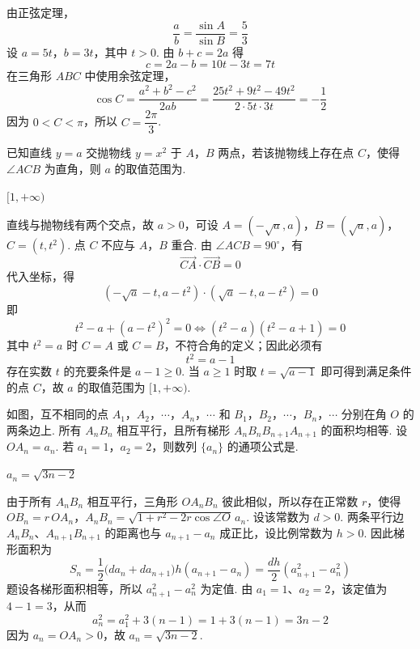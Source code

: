 \begin{solution}
由正弦定理，
\[
\frac{a}{b}=\frac{\sin A}{\sin B}=\frac53
\]
设 \(a=5t\)，\(b=3t\)，其中 \(t>0\). 由 \(b+c=2a\) 得
\[
c=2a-b=10t-3t=7t
\]
在三角形 \(ABC\) 中使用余弦定理，
\[
\cos C=\frac{a^2+b^2-c^2}{2ab}
=\frac{25t^2+9t^2-49t^2}{2\cdot5t\cdot3t}
=-\frac12
\]
因为 \(0<C<\pi\)，所以 \(C=\dfrac{2\pi}{3}\).
\end{solution}

\begin{problem}
已知直线 \( y = a \) 交抛物线 \( y = x^2 \) 于 \(A\)，\(B\) 两点，若该抛物线上存在点 \(C\)，使得 \( \angle ACB \) 为直角，则 \( a \) 的取值范围为\fillinblank{}.
\end{problem}

\begin{answer}
\([1,+\infty)\)
\end{answer}

\begin{solution}
直线与抛物线有两个交点，故 \(a>0\)，可设
\(A=(-\sqrt a,a)\)，\(B=(\sqrt a,a)\)，\(C=(t,t^2)\).
点 \(C\) 不应与 \(A\)，\(B\) 重合. 由 \(\angle ACB=90^\circ\)，有
\[
\overrightarrow{CA}\cdot\overrightarrow{CB}=0
\]
代入坐标，得
\[
(-\sqrt a-t,a-t^2)\cdot(\sqrt a-t,a-t^2)=0
\]
即
\[
t^2-a+(a-t^2)^2=0
\Longleftrightarrow (t^2-a)(t^2-a+1)=0
\]
其中 \(t^2=a\) 时 \(C=A\) 或 \(C=B\)，不符合角的定义；因此必须有
\[
t^2=a-1
\]
存在实数 \(t\) 的充要条件是 \(a-1\geqslant0\). 当 \(a\geqslant1\) 时取 \(t=\sqrt{a-1}\) 即可得到满足条件的点 \(C\)，故 \(a\) 的取值范围为 \([1,+\infty)\).
\end{solution}

\begin{problem}
如图，互不相同的点 \(A_{1}\)，\(A_{2}\)，\(\cdots\)，\(A_{n}\)，\(\cdots\) 和 \(B_{1}\)，\(B_{2}\)，\(\cdots\)，\(B_{n}\)，\(\cdots\) 分别在角 \(O\) 的两条边上. 所有 \(A_{n}B_{n}\) 相互平行，且所有梯形 \(A_{n}B_{n}B_{n+1}A_{n+1}\) 的面积均相等. 设 \(OA_{n} = a_{n}\). 若 \(a_{1} = 1\)，\(a_{2} = 2\)，则数列 \(\{a_{n}\}\) 的通项公式是\fillinblank{}.

\end{problem}

\begin{answer}
\(a_n=\sqrt{3n-2}\)
\end{answer}

\begin{solution}
由于所有 \(A_nB_n\) 相互平行，三角形 \(OA_nB_n\) 彼此相似，所以存在正常数 \(r\)，使得
\(OB_n=r\,OA_n\)，\(A_nB_n=\sqrt{1+r^2-2r\cos\angle O}\,a_n\).
设该常数为 \(d>0\). 两条平行边 \(A_nB_n\)、\(A_{n+1}B_{n+1}\) 的距离也与 \(a_{n+1}-a_n\) 成正比，设比例常数为 \(h>0\). 因此梯形面积为
\[
S_n=\frac12\bigl(da_n+da_{n+1}\bigr)h(a_{n+1}-a_n)
=\frac{dh}{2}\left(a_{n+1}^2-a_n^2\right)
\]
题设各梯形面积相等，所以 \(a_{n+1}^2-a_n^2\) 为定值. 由 \(a_1=1\)、\(a_2=2\)，该定值为 \(4-1=3\)，从而
\[
a_n^2=a_1^2+3(n-1)=1+3(n-1)=3n-2
\]
因为 \(a_n=OA_n>0\)，故 \(a_n=\sqrt{3n-2}\).
\end{solution}

